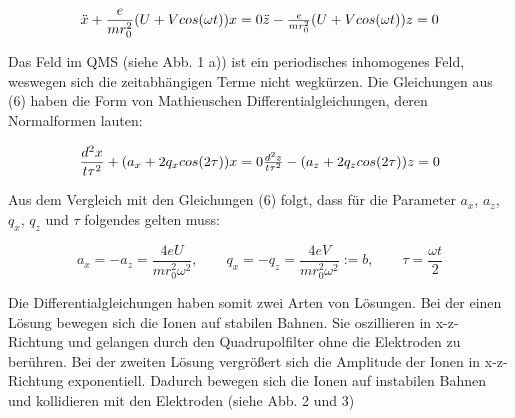 \begin{equation}
\ddot{x} + \frac{e}{mr_{0}^{2}}(U+V cos (\omega t)) x = 0
$$\\$$
\ddot{z} - \frac{e}{mr_{0}^{2}}(U+V cos (\omega t)) z = 0
\end{equation}

Das Feld im QMS (siehe Abb. 1 a)) ist ein periodisches inhomogenes Feld, weswegen sich die zeitabhängigen Terme nicht wegkürzen. Die Gleichungen aus (6) haben die Form von Mathieuschen Differentialgleichungen, deren Normalformen lauten:

\begin{equation}
\frac{d^{2}x}{t\tau^{2}}+(a_{x}+2q_{x}cos (2\tau)) x = 0
$$\\$$
\frac{d^{2}z}{t\tau^{2}}-(a_{z}+2q_{z}cos (2\tau)) z = 0
\end{equation}

Aus dem Vergleich mit den Gleichungen (6) folgt, dass für die Parameter $a_{x}$, $a_{z}$, $q_{x}$, $q_{z}$ und $\tau$ folgendes gelten muss:

\begin{equation}
a_{x} = -a_{z} = \frac{4eU}{mr_{0}^{2}\omega^{2}},\qquad q_{x}= -q_{z}= \frac{4eV}{mr_{0}^{2}\omega^{2}} := b,\qquad \tau =\frac{\omega t}{2}
\end{equation}

Die Differentialgleichungen haben somit zwei Arten von Lösungen. Bei der einen Lösung bewegen sich die Ionen auf stabilen Bahnen. Sie oszillieren in x-z-Richtung und gelangen durch den Quadrupolfilter ohne die Elektroden zu berühren. Bei der zweiten Lösung vergrößert sich die Amplitude der Ionen in x-z-Richtung exponentiell. Dadurch bewegen sich die Ionen auf instabilen Bahnen und kollidieren mit den Elektroden (siehe Abb. 2 und 3)

\vspace{1cm}

